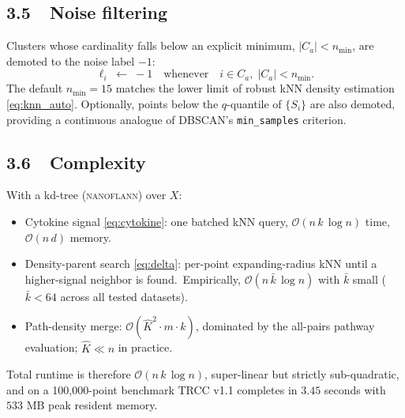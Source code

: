 
\subsection*{3.5~~Noise filtering}

Clusters whose cardinality falls below an explicit minimum,
$|C_a| < n_{\min}$, are demoted to the noise label $-1$:
\begin{equation}
\label{eq:noise}
\ell_i \;\leftarrow\; -1 \quad\text{whenever}\quad i \in C_a,\; |C_a| < n_{\min}.
\end{equation}
The default $n_{\min} = 15$ matches the lower limit of robust kNN density
estimation \eqref{eq:knn_auto}. Optionally, points below the
$q$-quantile of $\{S_i\}$ are also demoted, providing a continuous
analogue of DBSCAN's \texttt{min\_samples} criterion.


\subsection*{3.6~~Complexity}

With a kd-tree (\textsc{nanoflann}) over $X$:
\begin{itemize}
\item Cytokine signal \eqref{eq:cytokine}: one batched kNN query,
      $\mathcal{O}(n\,k\,\log n)$ time, $\mathcal{O}(n\,d)$ memory.
\item Density-parent search \eqref{eq:delta}: per-point expanding-radius
      kNN until a higher-signal neighbor is found.\ Empirically,
      $\mathcal{O}(n\,\bar k\,\log n)$ with $\bar k$ small ($\bar k < 64$
      across all tested datasets).
\item Path-density merge: $\mathcal{O}(\hat K^2 \cdot m \cdot k)$, dominated
      by the all-pairs pathway evaluation; $\hat K \ll n$ in practice.
\end{itemize}
Total runtime is therefore $\mathcal{O}(n\,k\,\log n)$, super-linear but
strictly sub-quadratic, and on a 100,000-point benchmark TRCC v1.1
completes in $3.45$ seconds with $533$ MB peak resident memory.
